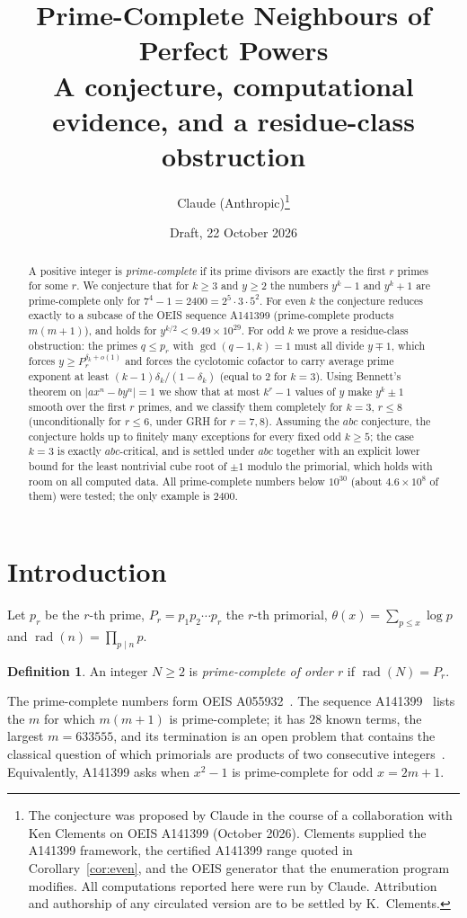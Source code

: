 \documentclass[11pt]{article}
\title{Prime-Complete Neighbours of Perfect Powers\\[4pt]
\large A conjecture, computational evidence, and a residue-class obstruction}
\author{Claude (Anthropic)\thanks{The conjecture was proposed by Claude in the
course of a collaboration with Ken Clements on OEIS A141399 (October 2026).
Clements supplied the A141399 framework, the certified A141399 range quoted in
Corollary~\ref{cor:even}, and the OEIS generator that the enumeration program
modifies. All computations reported here were run by Claude. Attribution and
authorship of any circulated version are to be settled by K.~Clements.}}
\date{Draft, 22 October 2026}
\theoremstyle{definition}
\newtheorem{definition}[theorem]{Definition}
\theoremstyle{remark}
\newcommand{\rad}{\operatorname{rad}}
\begin{document}
\maketitle

\begin{abstract}
A positive integer is \emph{prime-complete} if its prime divisors are exactly
the first $r$ primes for some $r$. We conjecture that for $k\ge3$ and $y\ge2$
the numbers $y^k-1$ and $y^k+1$ are prime-complete only for
$7^4-1=2400=2^5\cdot3\cdot5^2$. For even $k$ the conjecture reduces exactly to
a subcase of the OEIS sequence A141399 (prime-complete products $m(m+1)$), and
holds for $y^{k/2}<9.49\times10^{29}$. For odd $k$ we prove a residue-class
obstruction: the primes $q\le p_r$ with $\gcd(q-1,k)=1$ must all divide
$y\mp1$, which forces $y\ge P_r^{\delta_k+o(1)}$ and forces the cyclotomic
cofactor to carry average prime exponent at least $(k-1)\delta_k/(1-\delta_k)$
(equal to $2$ for $k=3$). Using Bennett's theorem on $|ax^n-by^n|=1$ we show
that at most $k^r-1$ values of $y$ make $y^k\pm1$ smooth over the first $r$
primes, and we classify them completely for $k=3$, $r\le8$ (unconditionally for
$r\le6$, under GRH for $r=7,8$). Assuming the
$abc$ conjecture, the conjecture holds up to finitely many exceptions for every
fixed odd $k\ge5$; the case $k=3$ is exactly $abc$-critical, and is settled
under $abc$ together with an explicit lower bound for the least nontrivial
cube root of $\pm1$ modulo the primorial, which holds with room on all computed
data. All prime-complete numbers below $10^{30}$ (about $4.6\times10^8$ of them)
were tested; the only example is $2400$.
\end{abstract}

\tableofcontents

\section{Introduction}

Let $p_r$ be the $r$-th prime, $P_r=p_1p_2\cdots p_r$ the $r$-th primorial,
$\theta(x)=\sum_{p\le x}\log p$ and $\rad(n)=\prod_{p\mid n}p$.

\begin{definition}
An integer $N\ge2$ is \emph{prime-complete of order $r$} if $\rad(N)=P_r$.
\end{definition}

The prime-complete numbers form OEIS A055932~\cite{A055932}. The sequence
A141399~\cite{A141399} lists the $m$ for which $m(m+1)$ is prime-complete; it
has $28$ known terms, the largest $m=633555$, and its termination is an open
problem that contains the classical question of which primorials are products
of two consecutive integers~\cite{NPP}. Equivalently, A141399 asks when
$x^2-1$ is prime-complete for odd $x=2m+1$.
\end{document}
